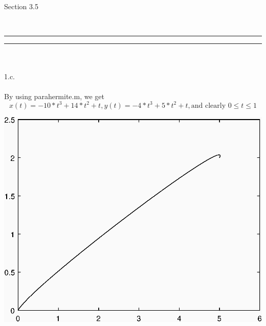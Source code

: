 \documentclass{article}
\begin{document}
\\\\\begin{large}Section 3.5\end{large}
\\\noindent\rule{16cm}{0.4pt}\noindent\rule{16cm}{0.4pt}
\\\\1.c.
\\\\By using parahermite.m, we get
\[x(t) =- 10*t^3 + 14*t^2 + t,y(t) =- 4*t^3 + 5*t^2 + t, \text{and clearly } 0\leq t\leq1\]
\begin{center}
   \includegraphics[scale=1]{2.eps}
\end{center}
\end{document}
